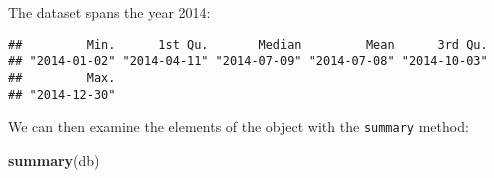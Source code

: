 \documentclass[]{book}
\newenvironment{Shaded}{\begin{snugshade}}{\end{snugshade}}
\newcommand{\CommentTok}[1]{\textcolor[rgb]{0.56,0.35,0.01}{\textit{#1}}}
\newcommand{\KeywordTok}[1]{\textcolor[rgb]{0.13,0.29,0.53}{\textbf{#1}}}
\newcommand{\NormalTok}[1]{#1}
\newcommand{\OperatorTok}[1]{\textcolor[rgb]{0.81,0.36,0.00}{\textbf{#1}}}
\newcommand{\StringTok}[1]{\textcolor[rgb]{0.31,0.60,0.02}{#1}}
\begin{document}
The dataset spans the year 2014:

\begin{Shaded}
\end{Shaded}

\begin{verbatim}
##         Min.      1st Qu.       Median         Mean      3rd Qu. 
## "2014-01-02" "2014-04-11" "2014-07-09" "2014-07-08" "2014-10-03" 
##         Max. 
## "2014-12-30"
\end{verbatim}

We can then examine the elements of the object with the \texttt{summary} method:

\begin{Shaded}
\begin{Highlighting}[]
\KeywordTok{summary}\NormalTok{(db)}
\end{Highlighting}
\end{Shaded}
\end{document}
